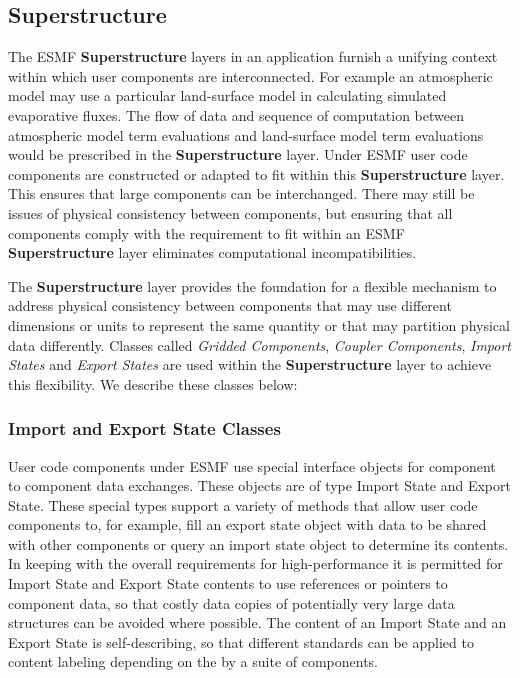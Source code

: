 \subsection{Superstructure}
\label{sec:superstructure}
The ESMF {\bf Superstructure} layers in an application furnish a unifying context within which user components are interconnected. For 
example an atmospheric model may use a particular land-surface model in calculating simulated evaporative fluxes. 
The flow of data and sequence of computation between atmospheric model term evaluations and land-surface model
term evaluations would be prescribed in the {\bf Superstructure} layer. Under ESMF user code components are constructed or adapted
to fit within this {\bf Superstructure} layer. This ensures that large components can be interchanged. There may still be issues
of physical consistency between components, but ensuring that all components comply with the requirement to fit
within an ESMF {\bf Superstructure} layer eliminates computational incompatibilities. 

The {\bf Superstructure} layer provides
the foundation for a flexible mechanism to address physical consistency between components that may use different dimensions or units to represent the
same quantity or that may partition physical data differently. Classes called {\it Gridded Components}, 
{\it Coupler Components}, {\it Import States} and {\it Export States} are used within the {\bf Superstructure} layer
to achieve this flexibility.
We describe these classes below:

\subsubsection{Import and Export State Classes}
User code components under ESMF use special interface objects for component to component data exchanges. These objects are 
of type Import State and Export State. These special types support a variety of methods that allow user code components 
to, for example, fill an export state object with data to be shared with other components or query an import state object to 
determine its contents. In keeping with the overall requirements for high-performance it is permitted for Import State and
Export State contents to use references or pointers to component data, so that costly data copies of potentially
very large data structures can be avoided where possible. The content of an Import State and an Export State is 
self-describing, so that different standards can be applied to content labeling depending on the 
by a suite of components.

